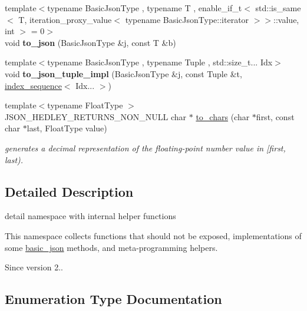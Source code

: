 \begin{DoxyCompactItemize}
\item 
\mbox{\label{namespacenlohmann_1_1detail_aaa77b0c9745130b77733a92a1a2e82ec}} 
{\footnotesize template$<$typename Basic\+Json\+Type , typename T , enable\+\_\+if\+\_\+t$<$ std\+::is\+\_\+same$<$ T, iteration\+\_\+proxy\+\_\+value$<$ typename Basic\+Json\+Type\+::iterator $>$$>$\+::value, int $>$  = 0$>$ }\\void {\bfseries to\+\_\+json} (Basic\+Json\+Type \&j, const T \&b)
\item 
\mbox{\label{namespacenlohmann_1_1detail_a510dfa15b01e9a8afe31600a27b28199}} 
{\footnotesize template$<$typename Basic\+Json\+Type , typename Tuple , std\+::size\+\_\+t... Idx$>$ }\\void {\bfseries to\+\_\+json\+\_\+tuple\+\_\+impl} (Basic\+Json\+Type \&j, const Tuple \&t, \mbox{\hyperlink{structnlohmann_1_1detail_1_1index__sequence}{index\+\_\+sequence}}$<$ Idx... $>$)
\item 
{\footnotesize template$<$typename Float\+Type $>$ }\\J\+S\+O\+N\+\_\+\+H\+E\+D\+L\+E\+Y\+\_\+\+R\+E\+T\+U\+R\+N\+S\+\_\+\+N\+O\+N\+\_\+\+N\+U\+LL char $\ast$ \mbox{\hyperlink{namespacenlohmann_1_1detail_a6cca370ac6c99294dbe4fe24716a57dd}{to\+\_\+chars}} (char $\ast$first, const char $\ast$last, Float\+Type value)
\begin{DoxyCompactList}\small\item\em generates a decimal representation of the floating-\/point number value in \mbox{[}first, last). \end{DoxyCompactList}\end{DoxyCompactItemize}


\subsection{Detailed Description}
detail namespace with internal helper functions 

This namespace collects functions that should not be exposed, implementations of some \mbox{\hyperlink{classnlohmann_1_1basic__json}{basic\+\_\+json}} methods, and meta-\/programming helpers.

\begin{DoxySince}{Since}
version 2.. 
\end{DoxySince}


\subsection{Enumeration Type Documentation}
\mbox{\label{namespacenlohmann_1_1detail_a5a76b60b26dc8c47256a996d18d967df}} 
